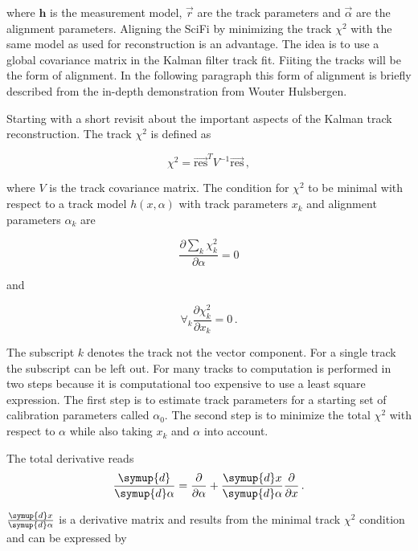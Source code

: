 where $\symbf{h}$ is the measurement model, $\vec{r}$ are the track parameters and $\vec{\alpha}$ are the alignment parameters.
Aligning the SciFi by minimizing the track $\chi^2$ with the same model as used for reconstruction is an advantage. The idea is to use a global covariance matrix in the Kalman filter track fit. Fiiting the tracks will be the form of alignment.
In the following paragraph this form of alignment is briefly described from the in-depth demonstration from Wouter Hulsbergen\cite{HULSBERGEN1}.

Starting with a short revisit about the important aspects of the Kalman track reconstruction. The track $\chi^2$ is defined as

\begin{equation}
  \chi^2 = \vec{\text{res}}^T V^{-1} \vec{\text{res}}\,,
\end{equation}

where $V$ is the track covariance matrix.
The condition for $\chi^2$ to be minimal with respect to a track model $h(x,\alpha)$ with track parameters $x_k$ and alignment parameters $\alpha_k$ are

\begin{equation}
  \frac{\partial\sum_k\chi^2_k}{\partial \alpha} = 0
\end{equation}

 and

 \begin{equation}
   \forall_k \frac{\partial\chi^2_k}{\partial x_k} = 0\,.
 \end{equation}

The subscript $k$ denotes the track not the vector component. For a single track the subscript can be left out. For many tracks to computation is performed in two steps because it is computational too expensive to use a least square expression.
The first step is to estimate track parameters for a starting set of calibration parameters called $\alpha_0$. The second step is to minimize the total $\chi^2$ with respect to $\alpha$ while also taking $x_k$ and $\alpha$ into account.

The total derivative reads
\begin{equation}
  \frac{\symup{d}}{\symup{d}\alpha} = \frac{\partial}{\partial\alpha} +
  \frac{\symup{d}x}{\symup{d}\alpha}\frac{\partial}{\partial x}\,.
\end{equation}

$\frac{\symup{d}x}{\symup{d}\alpha}$ is a derivative matrix and results from the minimal track $\chi^2$ condition and can be expressed by

